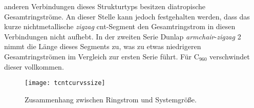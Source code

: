 anderen Verbindungen dieses Strukturtyps besitzen diatropische Gesamtringströme. An dieser Stelle kann jedoch festgehalten werden, dass das kurze nichtmetallische \textit{zigzag} \ac{cnt}-Segment den Gesamtringstrom in diesen Verbindungen nicht aufhebt. In der zweiten Serie \glqq Dunlap \textit{armchair}-\textit{zigzag} 2\grqq{} nimmt die Länge dieses Segments zu, was zu etwas niedrigeren Gesamtringströmen im Vergleich zur ersten Serie führt. Für C$_{960}$ verschwindet dieser vollkommen. \\

\begin{figure}[ht!]
	\centering
	\texttt{[image: tcntcurvssize]}
	\captionsetup{figurewithin = chapter}
	\captionsetup{font=small, labelfont=bf}\caption[Zusammenhang zwischen Ringstrom und Systemgröße]{Zusammenhang zwischen Ringstrom und Systemgröße.}
\label{abb:tcntcurvssize}
\end{figure}


